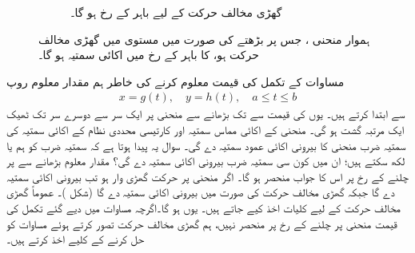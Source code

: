\begin{figure}
\begin{subfigure}{0.50\textwidth}
\caption
{گھڑی مخالف حرکت کے لیے  باہر  کے رخ ہو گا۔}
\end{subfigure}
\caption{
ہموار منحنی ، جس پر  بڑھتے  کی صورت میں مستوی  میں  گھڑی مخالف حرکت  ہو،  کا باہر کے  رخ  میں اکائی
 سمتیہ  ہو گا۔
}
\label{شکل_سمتی_تکمل_گھڑی_وار}
\end{figure}


مساوات  کے تکمل کی قیمت معلوم کرنے کی خاطر ہم مقدار معلوم روپ 
\begin{align*}
x=g(t),\quad y=h(t),\quad a\le t\le b
\end{align*}
سے ابتدا کرتے ہیں۔ یوں   کی قیمت  سے   تک بڑھانے سے منحنی پر ایک سر سے دوسرے سر تک ٹھیک ایک مرتبہ گشت ہو گی۔ منحنی کے اکائی مماس سمتیہ  اور کارتیسی محددی نظام کے اکائی سمتیہ  کی سمتیہ ضرب منحنی کا بیرونی اکائی عمود سمتیہ  دے گی۔ سوال یہ  پیدا ہوتا ہے کہ  سمتیہ ضرب کو ہم    یا  لکھ سکتے ہیں؛ ان میں کون سی سمتیہ ضرب   بیرونی اکائی سمتیہ دے گی؟ مقدار معلوم  بڑھانے سے  پر چلنے کے رخ پر اس کا جواب منحصر ہو گا۔ اگر منحنی پر حرکت گھڑی وار ہو تب  بیرونی اکائی سمتیہ دے گا جبکہ گھڑی مخالف حرکت کی صورت میں  بیرونی اکائی سمتیہ دے گا (شکل )۔ عموماً گھڑی مخالف حرکت کے لیے کلیات اخذ کیے جاتے ہیں۔ یوں   ہو گا۔اگرچہ مساوات  میں دیے گئے تکمل کی قیمت منحنی پر چلنے کے رخ پر منحصر نہیں، ہم گھڑی مخالف حرکت تصور کرتے ہوئے   مساوات  کو حل کرنے کے کلیے اخذ کرتے ہیں۔ 


